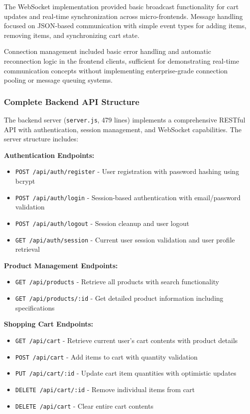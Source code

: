 \documentclass[12pt,a4paper]{report}
\begin{document}
The WebSocket implementation provided basic broadcast functionality for cart updates and real-time synchronization across micro-frontends. Message handling focused on JSON-based communication with simple event types for adding items, removing items, and synchronizing cart state.

Connection management included basic error handling and automatic reconnection logic in the frontend clients, sufficient for demonstrating real-time communication concepts without implementing enterprise-grade connection pooling or message queuing systems.

\subsubsection{Complete Backend API Structure}

The backend server (\texttt{server.js}, 479 lines) implements a comprehensive RESTful API with authentication, session management, and WebSocket capabilities. The server structure includes:

\textbf{Authentication Endpoints:}
\begin{itemize}
\item \texttt{POST /api/auth/register} - User registration with password hashing using bcrypt
\item \texttt{POST /api/auth/login} - Session-based authentication with email/password validation  
\item \texttt{POST /api/auth/logout} - Session cleanup and user logout
\item \texttt{GET /api/auth/session} - Current user session validation and user profile retrieval
\end{itemize}

\textbf{Product Management Endpoints:}
\begin{itemize}
\item \texttt{GET /api/products} - Retrieve all products with search functionality
\item \texttt{GET /api/products/:id} - Get detailed product information including specifications
\end{itemize}

\textbf{Shopping Cart Endpoints:}
\begin{itemize}
\item \texttt{GET /api/cart} - Retrieve current user's cart contents with product details
\item \texttt{POST /api/cart} - Add items to cart with quantity validation
\item \texttt{PUT /api/cart/:id} - Update cart item quantities with optimistic updates
\item \texttt{DELETE /api/cart/:id} - Remove individual items from cart
\item \texttt{DELETE /api/cart} - Clear entire cart contents
\end{itemize}
\end{document}
